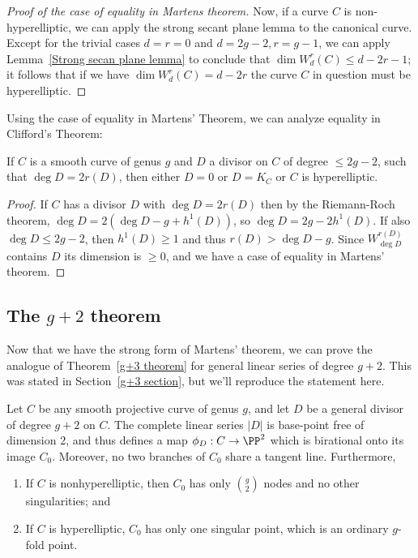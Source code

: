 \begin{proof}[Proof of the case of equality in Martens theorem]
 Now, if a curve $C$ is non-hyperelliptic, we can apply the strong secant plane lemma to the canonical curve. Except for the trivial cases $d=r=0$ and $d=2g-2, r=g-1$,
 we can apply Lemma~\ref{Strong secan plane lemma} to conclude that $\dim W^r_d(C) \leq d-2r-1$; it follows that if we have $\dim W^r_d(C) = d-2r$ the curve $C$ in question must be hyperelliptic.
\end{proof}

Using the case of equality in Martens' Theorem, we can analyze equality in 
Clifford's Theorem:

\begin{corollary}\label{equality in Clifford from Martens}
If $C$ is a smooth curve of genus $g$ and $D$ a divisor on $C$ of degree $\leq 2g-2$,
such that $\deg D = 2r(D)$, then either $D =0$ or $D=K_C$ or $C$ is hyperelliptic.
\end{corollary}

\begin{proof}
If $C$ has a divisor $D$ with $\deg D =2 r(D)$ then by the Riemann-Roch theorem,  $\deg D  = 2(\deg D-g+h^1(D))$, 
so $\deg D = 2g-2h^1(D)$. If also $\deg D\leq 2g-2$, then $h^1(D) \geq 1$
and thus $r(D) >\deg D-g$. Since $W^{r(D)}_{\deg D}$ contains $D$ its dimension
is $\geq 0$, and we have a case of equality in Martens' theorem.
\end{proof}


\subsection{The $g+2$ theorem}\label{g+2 section}

Now that we have the strong form of Martens' theorem, we can prove the analogue of Theorem~\ref{g+3 theorem} for general linear series of degree $g+2$. This was stated in Section~\ref{g+3 section}, but we'll reproduce the statement here.

\begin{theorem}
Let $C$ be any smooth projective curve of genus $g$, and let $D$ be a general divisor of degree $g+2$ on $C$. 
The complete linear series $|D|$ is base-point free of dimension 2, and thus defines a map $\phi_D: C\to \PP^2$
which is birational onto its image $C_0$. Moreover, no two branches of $C_0$ share a tangent line. Furthermore,

\begin{enumerate}
\item If $C$ is nonhyperelliptic, then $C_0$ has only $\binom{g}{2}$ nodes and no other singularities; and
\item If $C$ is hyperelliptic,  $C_0$ has only one singular point, which is an ordinary $g$-fold point.\end{enumerate}
\end{theorem}

